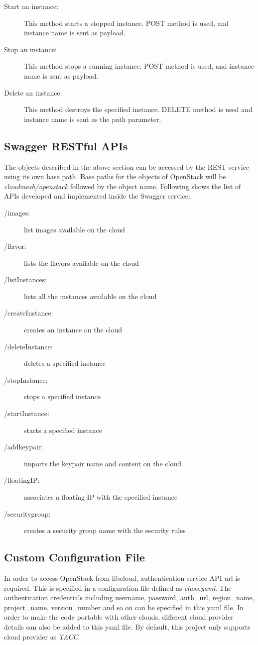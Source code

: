 \begin{description}
   \item[Start an instance:] This method starts a stopped instance.
   POST method is used, and instance name is sent as payload. 

   \item[Stop an instance:] This method stops a running instance. POST
   method is used, and instance name is sent as payload. 

   \item[Delete an instance:] This method destroys the specified
   instance. DELETE method is used and instance name is sent as the path
   parameter. 

\end{description}    

\subsection{Swagger RESTful APIs}
The objects described in the above section can be accessed by the REST service
using its own base path. Base paths for the objects of OpenStack will be
\textit{cloudmesh/openstack} followed by the object name. Following shows the
list of APIs developed and implemented inside the Swagger service:

\begin{description}
\item[/images:] list images available on the cloud
\item[/flavor:] lists the flavors available on the cloud
\item[/listInstances:] lists all the instances available on the cloud
\item[/createInstance:] creates an instance on the cloud
\item[/deleteInstance:] deletes a specified instance
\item[/stopInstance:] stops a specified instance
\item[/startInstance:] starts a specified instance
\item[/addkeypair:] imports the keypair name and content on the cloud
\item[/floatingIP:] associates a floating IP with the specified 
instance
\item[/securitygroup:] creates a security group name with the security
rules 
\end{description}

\subsection{Custom Configuration File}
In order to access OpenStack from libcloud, authentication service API url is
required. This is specified in a configuration file defined as
\textit{class.yaml}. The authentication credentials including username,
password, auth\_url, region\_name, project\_name, version\_number and so on 
can be specified in this yaml file. In order to make the code portable with 
other clouds, different cloud provider details can also be added to this yaml 
file. By default, this project only supports cloud provider as \textit{TACC}. 


